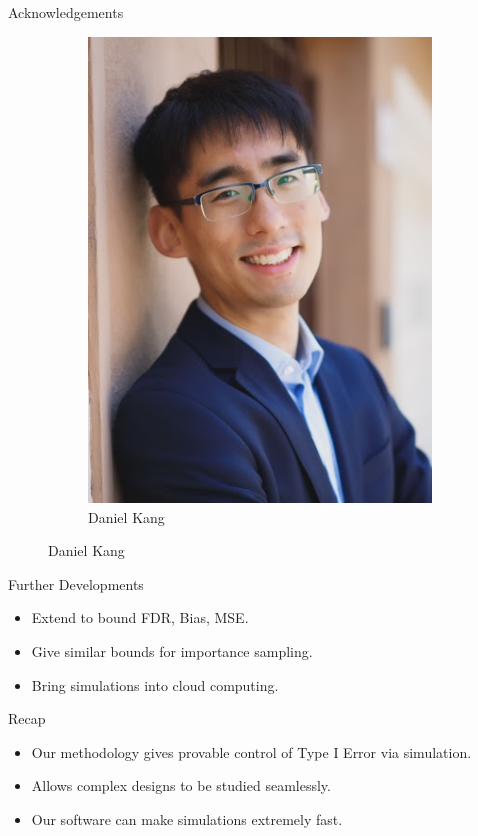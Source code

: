 \begin{frame}{Acknowledgements}
\begin{figure}
\begin{subfigure}[b]{0.3\textwidth}
        \includegraphics[width=\textwidth]{figures/daniel-kang.jpeg}
        \caption{Daniel Kang}
    \end{subfigure}
\end{figure}
\end{frame}

\begin{frame}{Further Developments}
\begin{itemize}
    \item Extend to bound FDR, Bias, MSE.
    \item Give similar bounds for importance sampling.
    \item Bring simulations into cloud computing.
\end{itemize} 
\end{frame}

\begin{frame}{Recap}
\begin{itemize}
    \item Our methodology gives provable control of Type I Error via simulation.
    \item Allows complex designs to be studied seamlessly.
    \item Our software can make simulations extremely fast.
\end{itemize}
\end{frame}
